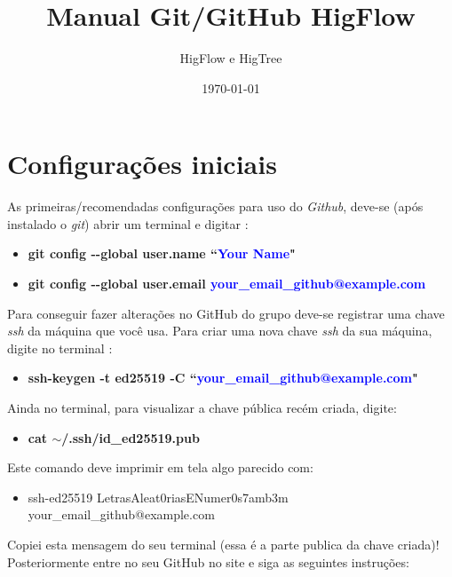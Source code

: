 \documentclass[12pt]{article}
\begin{document}
\title{Manual Git/GitHub HigFlow}
\author{HigFlow e HigTree}
\date{\today}
\maketitle

\section{Configurações iniciais}\label{sec:configuracoes}
As primeiras/recomendadas configurações para uso do \textit{Github}, deve-se (após instalado o \textit{git}) abrir um terminal e digitar \cite{site1}:
\begin{itemize}
	\item \textbf{git config  -\hspace{0.5mm}-global user.name ``\textcolor{blue}{Your Name}"}
	\item \textbf{git config -\hspace{0.5mm}-global user.email \textcolor{blue}{your\_email\_github@example.com}}
\end{itemize}

Para conseguir fazer alterações no GitHub do grupo deve-se registrar uma chave \textit{ssh} da máquina que você usa. Para criar uma nova chave \textit{ssh} da sua máquina, digite no terminal \cite{site2}:
\begin{itemize}
	\item \textbf{ssh-keygen -t ed25519 -C ``\textcolor{blue}{your\_email\_github@example.com}"}
\end{itemize}
Ainda no terminal, para visualizar a chave pública recém criada, digite:
\begin{itemize}
	\item \textbf{cat $\sim$/.ssh/id\_ed25519.pub}
\end{itemize}
Este comando deve imprimir em tela algo parecido com:
\begin{itemize}
	\item[] ssh-ed25519 LetrasAleat0riasENumer0s7amb3m your\_email\_github@example.com
\end{itemize}
Copiei esta mensagem do seu terminal (essa é a parte publica da chave criada)! Posteriormente entre no seu GitHub no site e siga as seguintes instruções:
\end{document}
